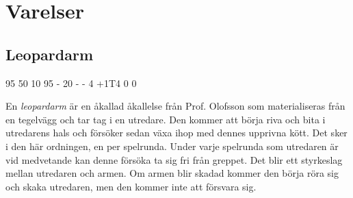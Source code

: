 \section{Varelser}
%
\subsection{Leopardarm}
\label{var:Leopardarm}
%
\character
{95}	%
{50}	%
{10}	%
{95}	%
{-}		%
{20}	%
{-}		%
{-}		%
{4}		%
{+1T4}	%
{0}		%
{0}		%
%
{
}
%
{
En \textit{leopardarm} är en åkallad åkallelse från Prof. Olofsson som materialiseras från en tegelvägg och tar tag i en utredare. Den kommer att börja riva och bita i utredarens hals och försöker sedan växa ihop med dennes upprivna kött. Det sker i den här ordningen, en per spelrunda. Under varje spelrunda som utredaren är vid medvetande kan denne försöka ta sig fri från greppet. Det blir ett styrkeslag mellan utredaren och armen. Om armen blir skadad kommer den börja röra sig och skaka utredaren, men den kommer inte att försvara sig.

}

